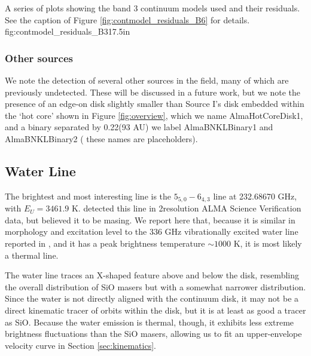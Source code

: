 \documentclass[twocolumn]{aastex61}
\begin{document}
{A series of plots showing the band 3 continuum models used and their residuals.
See the caption of Figure \ref{fig:contmodel_residuals_B6} for details.
}
{fig:contmodel_residuals_B3}{1}{7.5in}


\subsubsection{Other sources}
We note the detection of several other sources in the field, many of
which are previously undetected.  These will be discussed in a future work,
but we note the presence of an edge-on disk slightly smaller than Source I's
disk embedded within the `hot core' shown in Figure \ref{fig:overview},
which we name AlmaHotCoreDisk1, and a binary separated by 0.22\arcsec (93 AU)
we label AlmaBNKLBinary1 and AlmaBNKLBinary2 ({\color{red} these names are
placeholders}).


\subsection{Water Line}
The brightest and most interesting line is the \water $5_{5,0}-6_{4,3}$ line at
232.68670 GHz, with $E_U=3461.9$ K.  \citet{Hirota2012a} detected this line
in 2\arcsec resolution ALMA Science Verification data, but believed it to be
masing.  We report here that, because it is similar in morphology and
excitation level to the 336 GHz vibrationally excited water line reported in
\citet{Hirota2014a}, and it has a peak brightness temperature $\sim1000$ K, it
is most likely a thermal line.

The water line traces an X-shaped feature above and below the disk, 
resembling the overall distribution of SiO masers but with a somewhat narrower
distribution.  Since the water is not directly aligned with the continuum
disk, it may not be a direct kinematic tracer of orbits within the disk,
but it is at least as good a tracer as SiO.  Because the water emission is
thermal, though, it exhibits less extreme brightness fluctuations than 
the SiO masers, allowing us to fit an upper-envelope velocity curve in Section
\ref{sec:kinematics}.

\end{document}
